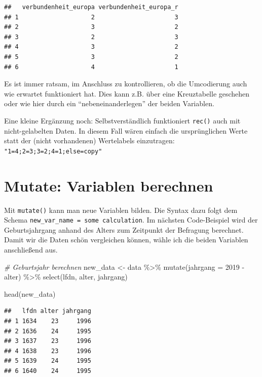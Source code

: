 \documentclass[
]{book}
\newenvironment{Shaded}{\begin{snugshade}}{\end{snugshade}}
\newcommand{\AttributeTok}[1]{\textcolor[rgb]{0.77,0.63,0.00}{#1}}
\newcommand{\CommentTok}[1]{\textcolor[rgb]{0.56,0.35,0.01}{\textit{#1}}}
\newcommand{\DecValTok}[1]{\textcolor[rgb]{0.00,0.00,0.81}{#1}}
\newcommand{\FunctionTok}[1]{\textcolor[rgb]{0.00,0.00,0.00}{#1}}
\newcommand{\NormalTok}[1]{#1}
\newcommand{\OtherTok}[1]{\textcolor[rgb]{0.56,0.35,0.01}{#1}}
\newcommand{\SpecialCharTok}[1]{\textcolor[rgb]{0.00,0.00,0.00}{#1}}
\begin{document}
\begin{verbatim}
##   verbundenheit_europa verbundenheit_europa_r
## 1                    2                      3
## 2                    3                      2
## 3                    2                      3
## 4                    3                      2
## 5                    3                      2
## 6                    4                      1
\end{verbatim}

Es ist immer ratsam, im Anschluss zu kontrollieren, ob die Umcodierung auch wie erwartet funktioniert hat. Dies kann z.B. über eine Kreuztabelle geschehen oder wie hier durch ein ``nebeneinanderlegen'' der beiden Variablen.

Eine kleine Ergänzung noch: Selbstverständlich funktioniert \texttt{rec()} auch mit nicht-gelabelten Daten. In diesem Fall wären einfach die ursprünglichen Werte statt der (nicht vorhandenen) Wertelabels einzutragen: \texttt{"1=4;2=3;3=2;4=1;else=copy"}

\hypertarget{mutate-variablen-berechnen}{%
\section{Mutate: Variablen berechnen}\label{mutate-variablen-berechnen}}

Mit \texttt{mutate()} kann man neue Variablen bilden. Die Syntax dazu folgt dem Schema \texttt{new\_var\_name\ =\ some\ calculation}. Im nächsten Code-Beispiel wird der Geburtsjahrgang anhand des Alters zum Zeitpunkt der Befragung berechnet. Damit wir die Daten schön vergleichen können, wähle ich die beiden Variablen anschließend aus.

\begin{Shaded}
\begin{Highlighting}[]
\CommentTok{\# Geburtsjahr berechnen}
\NormalTok{new\_data }\OtherTok{\textless{}{-}}\NormalTok{ data }\SpecialCharTok{\%\textgreater{}\%} 
  \FunctionTok{mutate}\NormalTok{(}\AttributeTok{jahrgang =} \DecValTok{2019} \SpecialCharTok{{-}}\NormalTok{ alter) }\SpecialCharTok{\%\textgreater{}\%} 
  \FunctionTok{select}\NormalTok{(lfdn, alter, jahrgang)}

\FunctionTok{head}\NormalTok{(new\_data)}
\end{Highlighting}
\end{Shaded}

\begin{verbatim}
##   lfdn alter jahrgang
## 1 1634    23     1996
## 2 1636    24     1995
## 3 1637    23     1996
## 4 1638    23     1996
## 5 1639    24     1995
## 6 1640    24     1995
\end{verbatim}
\end{document}
